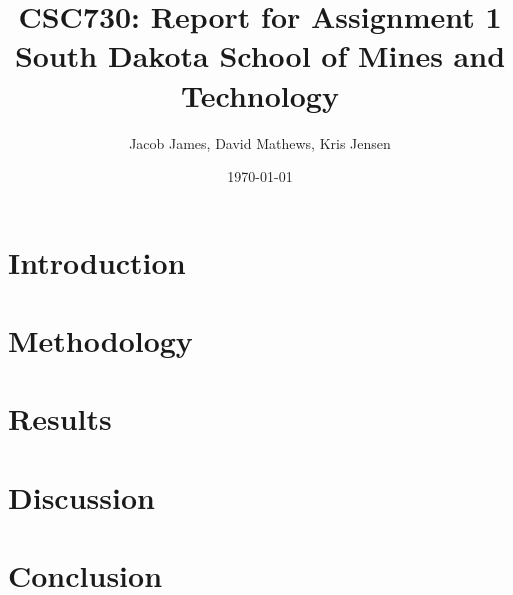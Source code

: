 \documentclass[twocolumn]{article}
\begin{document}
\onecolumn %
\setlength{\droptitle}{-6em} 
\title{CSC730: Report for Assignment 1 \\ \large South Dakota School of Mines and Technology}
\author{Jacob James, David Mathews, Kris Jensen}

\date{\today}
\maketitle

\begin{multicols}{2} %
    \let\clearpage\relax
    \section{Introduction}
    

    \let\clearpage\relax
    \section{Methodology}
    

    \let\clearpage\relax
    \section{Results}
    

    \let\clearpage\relax
    \section{Discussion}
    

    \let\clearpage\relax
    \section{Conclusion}
    
\end{multicols}
\end{document}
